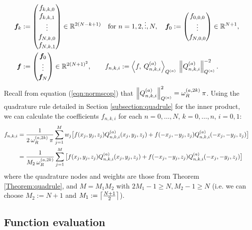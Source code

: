 \documentclass[11pt, oneside]{article}   	%
\begin{document}
\begin{align*}
	\bm{f}_k &:= 
		\begin{pmatrix}
			f_{k,k,0} \\
			f_{k,k,1} \\
			\vdots \\
			f_{N,k,0} \\
			f_{N,k,1}
		\end{pmatrix} \in \R^{2(N-k+1)} \quad \text{for } n = 1,2,\dots,N, \quad
	\bm{f}_0 := 
		\begin{pmatrix}
			f_{0,0,0} \\
			\vdots \\
			f_{N,0,0}
		\end{pmatrix} \in \R^{N+1}, \\
	\bm{f} &:= 
		\begin{pmatrix}
			\bm{f}_0 \\
			\vdots \\
			\bm{f}_N
		\end{pmatrix} \in \R^{2(N+1)^2}, \quad \quad
	f_{n,k,i} := \ip< f, \: \scopnkia>_{\scopa} \: \norm{\scopnkia}^{-2}_{\scopa}.
\end{align*}
Recall from equation (\ref{eqn:normscop}) that $\left\| Q_{n,k,i}^{(a)} \right\|^2_{Q^{(a)}} = \omega_R^{(a,2k)} \: \pi$. Using the quadrature rule detailed in Section \ref{subsection:quadrule} for the inner product, we can calculate the coefficients $f_{n,k,i}$ for each $n = 0,\dots,N$, $k = 0,\dots,n$, $i = 0,1$: 
\begin{align*}
	f_{n,k,i} &= \frac{1}{2 \: \omega_R^{(a,2k)} \: \pi} \sum_{j=1}^{M} w_j \big[ f(x_j, y_j, z_j) Q_{n,k,i}^{(a)}(x_j, y_j, z_j) +f(-x_j, -y_j, z_j) Q_{n,k,i}^{(a)}(-x_j, -y_j, z_j) \big] \\
	&= \frac{1}{M_2 \: \omega_R^{(a,2k)}} \sum_{j=1}^{M} \big[ f(x_j, y_j, z_j) Q_{n,k,i}^{(a)}(x_j, y_j, z_j) +f(-x_j, -y_j, z_j) Q_{n,k,i}^{(a)}(-x_j, -y_j, z_j) \big]
\end{align*}
where the quadrature nodes and weights are those from Theorem \ref{Theorem:quadrule}, and $M = M_1 M_2$ with $2M_1 - 1 \ge N, M_2 - 1 \ge N$ (i.e. we can choose $M_2 := N + 1$ and $M_1 := \left\lceil\frac{N+1}{2}\right\rceil$).




\subsection{Function evaluation}\label{subsection:functionevaluation}
\end{document}
